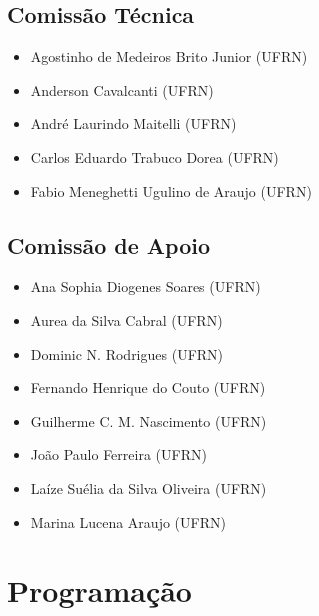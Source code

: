 \documentclass[12pt,a4paper,oneside,openany]{book}
\begin{document}
\section*{Comissão Técnica}
\begin{itemize}
  \item Agostinho de Medeiros Brito Junior (UFRN)
  \item Anderson Cavalcanti (UFRN)
  \item André Laurindo Maitelli (UFRN)
  \item Carlos Eduardo Trabuco Dorea (UFRN)
  \item Fabio Meneghetti Ugulino de Araujo (UFRN)
\end{itemize}

\section*{Comissão de Apoio}
\begin{itemize}
  \item Ana Sophia Diogenes Soares (UFRN)
  \item Aurea da Silva Cabral (UFRN)
  \item Dominic N. Rodrigues (UFRN)
  \item Fernando Henrique do Couto (UFRN)
  \item Guilherme C. M. Nascimento (UFRN)
  \item João Paulo Ferreira (UFRN)
  \item Laíze Suélia da Silva Oliveira (UFRN)
  \item Marina Lucena Araujo (UFRN)
\end{itemize}

\chapter*{Programação}
\end{document}
